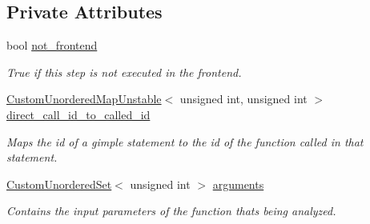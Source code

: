 \subsection*{Private Attributes}
\begin{DoxyCompactItemize}
\item 
bool \hyperlink{classBit__Value_ad7a83cc547266256277faf96c9774c4f}{not\+\_\+frontend}
\begin{DoxyCompactList}\small\item\em True if this step is not executed in the frontend. \end{DoxyCompactList}\item 
\hyperlink{custom__map_8hpp_a8cbaceffc09790a885ec7e9c17809c69}{Custom\+Unordered\+Map\+Unstable}$<$ unsigned int, unsigned int $>$ \hyperlink{classBit__Value_a97724dd3554d471ea1ad42f5b5b4f1cf}{direct\+\_\+call\+\_\+id\+\_\+to\+\_\+called\+\_\+id}
\begin{DoxyCompactList}\small\item\em Maps the id of a gimple statement to the id of the function called in that statement. \end{DoxyCompactList}\item 
\hyperlink{classCustomUnorderedSet}{Custom\+Unordered\+Set}$<$ unsigned int $>$ \hyperlink{classBit__Value_afb50fdc59b857254fab26a29218c65b7}{arguments}
\begin{DoxyCompactList}\small\item\em Contains the input parameters of the function that\textquotesingle{}s being analyzed. \end{DoxyCompactList}\end{DoxyCompactItemize}
